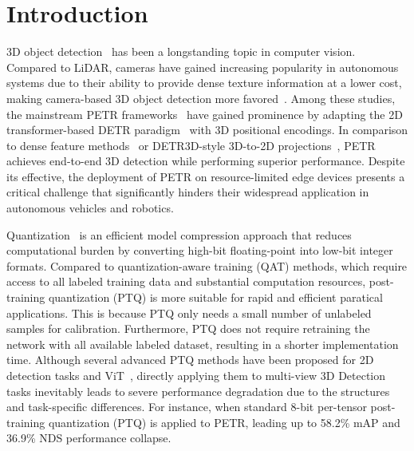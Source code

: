 \section{Introduction}
\label{sec:intro}

3D object detection~\cite{bevformer,zhou2023fastpillars,zhou2024pillarhist,liu2022bevfusion} has been a longstanding topic in computer vision. Compared to LiDAR, cameras have gained increasing popularity in autonomous systems due to their ability to provide dense texture information at a lower cost, making camera-based 3D object detection more favored~\cite{bevdet,bevdet4d,yu2024panoptic}. Among these studies, the mainstream PETR frameworks~\cite{streampetr,liu2022petr,liu2022petrv2,shu20233DPPE,cmt,wang2024omnidrive,wang2023object} have gained prominence by adapting the 2D transformer-based DETR paradigm~\cite{Carion2020EndtoEndOD} with 3D positional encodings. In comparison to dense feature methods~\cite{bevdet,yu2023flashocc,yu2024ultimatedo,bevdepth,lss} or DETR3D-style 3D-to-2D projections~\cite{wang2022detr3d,lin2022sparse4d,Liu2023SparseBEVHS}, PETR achieves end-to-end 3D detection while performing superior performance. Despite its effective, the deployment of PETR on resource-limited edge devices presents a critical challenge that significantly hinders their widespread application in autonomous vehicles and robotics.

Quantization~\cite{zhou2024lidar,zhang2023qd,Low_bit_quant_iccvw2019,nagel2020up} is an efficient model compression approach that reduces computational burden by converting high-bit floating-point into low-bit integer formats. Compared to quantization-aware training (QAT) methods, which require access to all labeled training data and substantial computation resources, post-training quantization (PTQ) is more suitable for rapid and efficient paratical applications. This is because PTQ only needs a small number of unlabeled samples for calibration. Furthermore, PTQ does not require retraining the network with all available labeled dataset, resulting in a shorter implementation time. Although several advanced PTQ methods have been proposed for 2D detection tasks\citep{li2021brecq, wei2022qdrop, liu2023pd} and ViT~\cite{li2023vit,liu2021ptqvit}, directly applying them to multi-view 3D Detection tasks inevitably leads to severe performance degradation due to the structures and task-specific differences. For instance, when standard 8-bit per-tensor post-training quantization (PTQ) is applied to PETR, leading up to 58.2\% mAP and 36.9\% NDS performance collapse.

